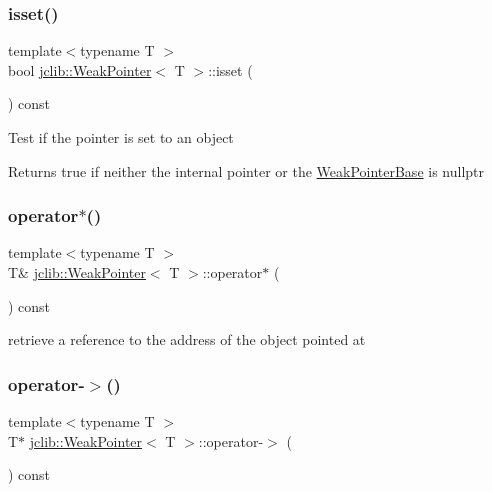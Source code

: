 \subsubsection{\texorpdfstring{isset()}{isset()}}
{\footnotesize\ttfamily template$<$typename T $>$ \\
bool \hyperlink{classjclib_1_1WeakPointer}{jclib\+::\+Weak\+Pointer}$<$ T $>$\+::isset (\begin{DoxyParamCaption}{ }\end{DoxyParamCaption}) const\hspace{0.3cm}{\ttfamily [inline]}}

Test if the pointer is set to an object
\begin{DoxyItemize}
\item \begin{DoxyReturn}{Returns}
true if neither the internal pointer or the \hyperlink{classjclib_1_1WeakPointerBase}{Weak\+Pointer\+Base} is nullptr 
\end{DoxyReturn}

\end{DoxyItemize}\mbox{\label{classjclib_1_1WeakPointer_ac315d93be7091e0700f7f692b37edb0c}} 
\subsubsection{\texorpdfstring{operator$\ast$()}{operator*()}}
{\footnotesize\ttfamily template$<$typename T $>$ \\
T\& \hyperlink{classjclib_1_1WeakPointer}{jclib\+::\+Weak\+Pointer}$<$ T $>$\+::operator$\ast$ (\begin{DoxyParamCaption}{ }\end{DoxyParamCaption}) const\hspace{0.3cm}{\ttfamily [inline]}}

retrieve a reference to the address of the object pointed at \mbox{\label{classjclib_1_1WeakPointer_a4b86a3794ba135e7400fbcd64915b68a}} 
\subsubsection{\texorpdfstring{operator-\/$>$()}{operator->()}}
{\footnotesize\ttfamily template$<$typename T $>$ \\
T$\ast$ \hyperlink{classjclib_1_1WeakPointer}{jclib\+::\+Weak\+Pointer}$<$ T $>$\+::operator-\/$>$ (\begin{DoxyParamCaption}{ }\end{DoxyParamCaption}) const\hspace{0.3cm}{\ttfamily [inline]}}

